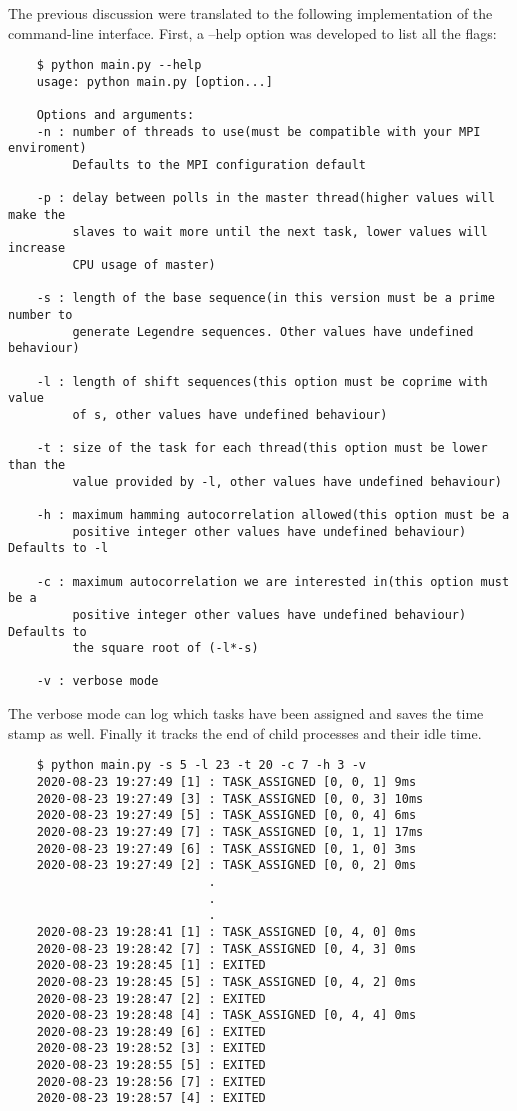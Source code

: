 The previous discussion were translated to the following implementation of the
command-line interface.
  First, a --help option was developed to list all the flags:
  \begin{lstlisting}
    $ python main.py --help
    usage: python main.py [option...]

    Options and arguments:
    -n : number of threads to use(must be compatible with your MPI enviroment)
         Defaults to the MPI configuration default

    -p : delay between polls in the master thread(higher values will make the
         slaves to wait more until the next task, lower values will increase
         CPU usage of master)

    -s : length of the base sequence(in this version must be a prime number to
         generate Legendre sequences. Other values have undefined behaviour)

    -l : length of shift sequences(this option must be coprime with value
         of s, other values have undefined behaviour)

    -t : size of the task for each thread(this option must be lower than the
         value provided by -l, other values have undefined behaviour)

    -h : maximum hamming autocorrelation allowed(this option must be a
         positive integer other values have undefined behaviour) Defaults to -l

    -c : maximum autocorrelation we are interested in(this option must be a
         positive integer other values have undefined behaviour) Defaults to
         the square root of (-l*-s)

    -v : verbose mode
  \end{lstlisting}

  The verbose mode can log which tasks have been assigned and saves the time stamp
  as well. Finally it tracks the end of child processes and their idle time.

  \begin{lstlisting}
    $ python main.py -s 5 -l 23 -t 20 -c 7 -h 3 -v
    2020-08-23 19:27:49 [1] : TASK_ASSIGNED [0, 0, 1] 9ms
    2020-08-23 19:27:49 [3] : TASK_ASSIGNED [0, 0, 3] 10ms
    2020-08-23 19:27:49 [5] : TASK_ASSIGNED [0, 0, 4] 6ms
    2020-08-23 19:27:49 [7] : TASK_ASSIGNED [0, 1, 1] 17ms
    2020-08-23 19:27:49 [6] : TASK_ASSIGNED [0, 1, 0] 3ms
    2020-08-23 19:27:49 [2] : TASK_ASSIGNED [0, 0, 2] 0ms
                            .
                            .
                            .
    2020-08-23 19:28:41 [1] : TASK_ASSIGNED [0, 4, 0] 0ms
    2020-08-23 19:28:42 [7] : TASK_ASSIGNED [0, 4, 3] 0ms
    2020-08-23 19:28:45 [1] : EXITED
    2020-08-23 19:28:45 [5] : TASK_ASSIGNED [0, 4, 2] 0ms
    2020-08-23 19:28:47 [2] : EXITED
    2020-08-23 19:28:48 [4] : TASK_ASSIGNED [0, 4, 4] 0ms
    2020-08-23 19:28:49 [6] : EXITED
    2020-08-23 19:28:52 [3] : EXITED
    2020-08-23 19:28:55 [5] : EXITED
    2020-08-23 19:28:56 [7] : EXITED
    2020-08-23 19:28:57 [4] : EXITED

  \end{lstlisting}

